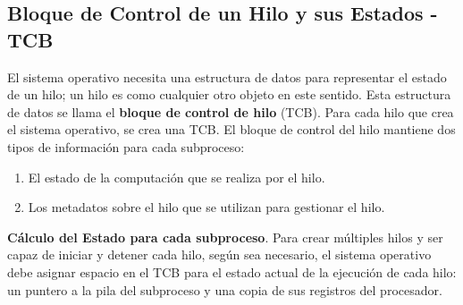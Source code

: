 \documentclass[10pt]{book}
\begin{document}
\subsection{Bloque de Control de un Hilo y sus Estados - TCB}
El sistema operativo necesita una estructura de datos para representar el estado de un hilo; un hilo es como cualquier otro objeto en este sentido. Esta estructura de datos se llama el \textbf{bloque de control de hilo} (TCB). Para cada hilo que crea el sistema operativo, se crea una TCB. El bloque de control del hilo mantiene dos tipos de información para cada subproceso:
\begin{enumerate}
\item El estado de la computación que se realiza por el hilo.
\item Los metadatos sobre el hilo que se utilizan para gestionar el hilo.
\end{enumerate}

\textbf{Cálculo del Estado para cada subproceso}. Para crear múltiples hilos y ser capaz de iniciar y detener cada hilo, según sea necesario, el sistema operativo debe asignar espacio en el TCB para el estado actual de la ejecución de cada hilo: un puntero a la pila del subproceso y una copia de sus registros del procesador.
\end{document}
